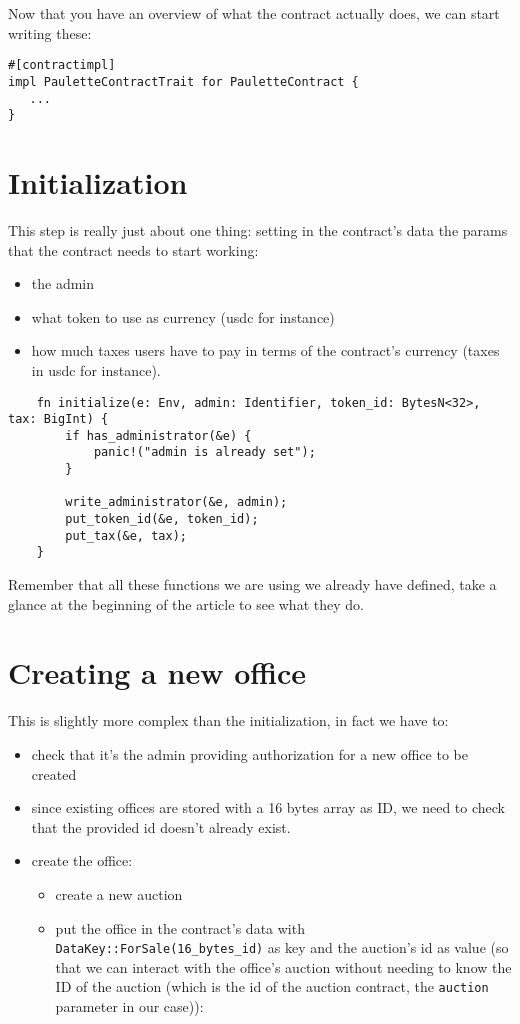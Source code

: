 \documentclass[10pt]{article}
\begin{document}
Now that you have an overview of what the contract actually does, we can start writing these:

\begin{verbatim}
#[contractimpl]
impl PauletteContractTrait for PauletteContract {
   ...
}
\end{verbatim}

\section*{Initialization}
This step is really just about one thing: setting in the contract's data the params that the contract needs to start working:

\begin{itemize}
  \item the admin
  \item what token to use as currency (usdc for instance)
  \item how much taxes users have to pay in terms of the contract's currency (taxes in usdc for instance).
\end{itemize}

\begin{verbatim}
    fn initialize(e: Env, admin: Identifier, token_id: BytesN<32>, tax: BigInt) {
        if has_administrator(&e) {
            panic!("admin is already set");
        }

        write_administrator(&e, admin);
        put_token_id(&e, token_id);
        put_tax(&e, tax);
    }
\end{verbatim}

Remember that all these functions we are using we already have defined, take a glance at the beginning of the article to see what they do.

\section*{Creating a new office}
This is slightly more complex than the initialization, in fact we have to:

\begin{itemize}
  \item check that it's the admin providing authorization for a new office to be created
  \item since existing offices are stored with a 16 bytes array as ID, we need to check that the provided id doesn't already exist.
  \item create the office:
  \begin{itemize}
    \item create a new auction
    \item put the office in the contract's data with \texttt{DataKey::ForSale(16\_bytes\_id)} as key and the auction's id as value (so that we can interact with the office's auction without needing to know the ID of the auction (which is the id of the auction contract, the \texttt{auction} parameter in our case)):
  \end{itemize}
\end{itemize}
\end{document}
